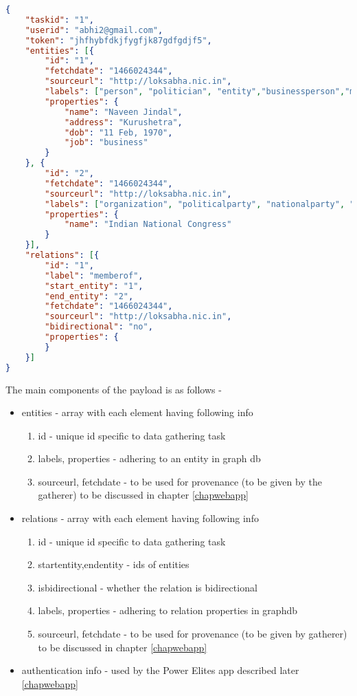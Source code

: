 \begin{lstlisting}[language=json,firstnumber=1]
{
    "taskid": "1",
    "userid": "abhi2@gmail.com",
    "token": "jhfhybfdkjfygfjk87gdfgdjf5",
    "entities": [{
        "id": "1",
        "fetchdate": "1466024344",
        "sourceurl": "http://loksabha.nic.in",
        "labels": ["person", "politician", "entity","businessperson","memberofParliament"],
        "properties": {
            "name": "Naveen Jindal",
            "address": "Kurushetra",
            "dob": "11 Feb, 1970",
            "job": "business"
        }
    }, {
        "id": "2",
        "fetchdate": "1466024344",
        "sourceurl": "http://loksabha.nic.in",
        "labels": ["organization", "politicalparty", "nationalparty", "entity"],
        "properties": {
            "name": "Indian National Congress"
        }
    }],
    "relations": [{
        "id": "1",
        "label": "memberof",
        "start_entity": "1",
        "end_entity": "2",
        "fetchdate": "1466024344",
        "sourceurl": "http://loksabha.nic.in",
        "bidirectional": "no",
        "properties": {
        }
    }]
}
\end{lstlisting}

The main components of the payload is as follows -
\begin{itemize}
    \item entities - array with each element having following info
        \begin{enumerate}
            \item id - unique id specific to data gathering task
            \item labels, properties - adhering to an entity in graph db
            \item sourceurl, fetchdate - to be used for provenance (to be given by the gatherer) to be discussed in chapter \ref{chapwebapp}
        \end{enumerate}
    \item relations - array with each element having following info
        \begin{enumerate}
            \item id - unique id specific to data gathering task
            \item startentity,endentity - ids of entities
            \item isbidirectional - whether the relation is bidirectional 
            \item labels, properties - adhering to relation properties in graphdb
            \item sourceurl, fetchdate - to be used for provenance (to be given by gatherer) to be discussed in chapter \ref{chapwebapp}
        \end{enumerate}
    \item authentication info - used by the Power Elites app described later \ref{chapwebapp}
\end{itemize}

